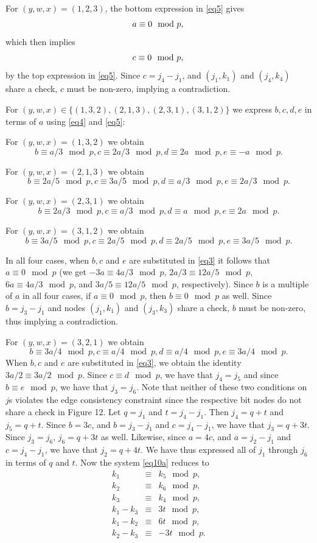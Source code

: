 For $(y,w,x)=(1,2,3)$, the bottom expression in \eqref{eq5} gives
\[
a \equiv 0 \mod p,\\
\]
which then implies
\[
c\equiv 0 \mod p,\\
\]
by the top expression in \eqref{eq5}. Since $c=j_4-j_1$, and
$(j_1,k_1)$ and $(j_4,k_4)$ share a check, $c$ must be non-zero,
implying a contradiction.

For $(y,w,x) \in \{ (1,3,2), (2,1,3), (2,3,1),(3,1,2)\}$ we
express $b,c,d,e$ in terms of $a$ using \eqref{eq4} and
\eqref{eq5}:

For $(y,w,x)=(1,3,2)$ we obtain \[b \equiv a/3 \mod p, c
\equiv2a/3 \mod p, d \equiv 2a \mod p, e \equiv -a \mod p.\]

For $(y,w,x)=(2,1,3)$ we obtain \[b \equiv 2a/5 \mod p, c \equiv
3a/5 \mod p, d \equiv a/3 \mod p, e \equiv 2a/3 \mod p.\]

For $(y,w,x)=(2,3,1)$ we obtain \[b \equiv 2a/3 \mod p, c \equiv
a/3 \mod p, d \equiv a \mod p, e \equiv 2a \mod p.\]

For $(y,w,x)=(3,1,2)$ we obtain \[b \equiv 3a/5 \mod p, c \equiv
2a/5 \mod p, d \equiv 2a/5 \mod p, e \equiv 3a/5 \mod p.\]

In all four cases, when $b,c$ and $e$ are substituted in
\eqref{eq3} it follows that $a \equiv 0 \mod p$ (we get $-3a
\equiv 4a/3 \mod p$, $2a/3 \equiv 12a/5 \mod p$, $6a \equiv 4a/3
\mod p$, and $3a/5 \equiv 12a/5 \mod p$, respectively). Since $b$
is a multiple of $a$ in all four cases, if $a \equiv 0 \mod p$,
then $b \equiv 0 \mod p$ as well. Since $b=j_3-j_1$ and nodes
$(j_1,k_1)$ and $(j_3,k_3)$ share a check, $b$ must be non-zero,
thus implying a contradiction.

For $(y,w,x)=(3,2,1)$ we obtain \[b \equiv 3a/4 \mod p, c \equiv
a/4 \mod p, d \equiv a/4 \mod p, e \equiv 3a/4 \mod p.\] When
$b,c$ and $e$ are substituted in \eqref{eq3}, we obtain the
identity $3a/2 \equiv 3a/2 \mod p$. Since $c \equiv d \mod p$, we
have that $j_4=j_5$ and since $b \equiv e \mod p$, we have that
$j_3=j_6$. Note that neither of these two conditions on $j$s
violates the edge consistency constraint since the respective bit
nodes do not share a check in Figure 12. Let $q=j_1$ and $t=j_4
-j_1$. Then $j_4=q+t$ and $j_5=q+t$. Since $b=3c$, and $b=j_3-j_1$
and $c=j_4-j_1$, we have that $j_3=q+3t$. Since $j_3=j_6$,
$j_6=q+3t$ as well. Likewise, since $a=4c$, and $a=j_2-j_1$ and
$c=j_4-j_1$, we have that $j_2=q+4t$. We have thus expressed all
of $j_1$ through $j_6$ in terms of $q$ and $t$. Now the system
\eqref{eq10a} reduces to
\begin{equation}\label{eq6}\begin{array}{ccc}
k_1 &\equiv& k_5 \mod p,\\
k_2 &\equiv& k_6 \mod p,\\
k_3 &\equiv& k_4 \mod p,\\
k_1 -k_3 &\equiv& 3t \mod p,\\
k_1 -k_2 &\equiv& 6t \mod p,\\
k_2 -k_3 &\equiv& -3t \mod p.\\
\end{array}\end{equation}

